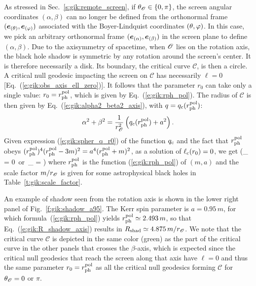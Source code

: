 As stressed in Sec.~\ref{s:gik:remote_screen}, if $\theta_{\mathscr{O}}\in\{0,\pi\}$,
the screen angular coordinates $(\alpha,\beta)$ can no longer be defined from the
orthonormal frame
$(\bm{e}_{(\theta)}, \bm{e}_{(\varphi)})$ associated with the Boyer-Lindquist coordinates $(\theta,\varphi)$.
In this case, we pick an arbitrary orthonormal
frame $(\bm{e}_{(\alpha)}, \bm{e}_{(\beta)})$ in the screen plane to define
$(\alpha,\beta)$.
Due to the axisymmetry of spacetime, when $\mathscr{O}$ lies on the rotation axis, the black hole
shadow is symmetric by any rotation around the screen's center. It
is therefore necessarily a disk. Its boundary, the critical curve $\mathscr{C}$,
is then a circle.
A critical null geodesic impacting the screen on $\mathscr{C}$
has necessarily $\ell=0$ [Eq.~(\ref{e:gik:obs_axis_ell_zero})]. It follows
that the parameter $r_0$ can take only a single value:
$r_0 = r_{\rm ph}^{\rm pol}$, which is
given by Eq.~(\ref{e:gik:rph_pol}). The radius of $\mathscr{C}$ is
then given by Eq.~(\ref{e:gik:alpha2_beta2_axis}), with $q=q_{\rm c}(r_{\rm ph}^{\rm pol})$:
\[
    \alpha^2 + \beta^2 = \frac{1}{r_{\mathscr{O}}^2} \left( q_{\rm c}(r_{\rm ph}^{\rm pol}) + a^2\right) .
\]
Given expression (\ref{e:gik:spher_q_r0}) of the function $q_{\rm c}$
and the fact that $r_{\rm ph}^{\rm pol}$ obeys
$(r_{\rm ph}^{\rm pol})^4 (r_{\rm ph}^{\rm pol} - 3m)^2 = a^4 (r_{\rm ph}^{\rm pol} + m)^2$,
as a solution of $\ell_{\rm c}(r_0) = 0$, we get
\be \label{e:gik:R_shadow_axis}
    \qquad (\th_{\Obs} = 0\ \mbox{or}\  \th_{\Obs} = \pi)
\ee
where $r_{\rm ph}^{\rm pol}$ is the function (\ref{e:gik:rph_pol}) of $(m, a)$
and the scale factor $m/r_{\mathscr{O}}$ is given for some astrophysical black holes
in Table~\ref{t:gik:scale_factor}.

\begin{texample}{}{}
An example of shadow seen from the rotation axis is shown in the lower right panel of
Fig.~\ref{f:gik:shadow_a95}. The Kerr spin parameter is $a=0.95\, m$, for which
formula~(\ref{e:gik:rph_pol})
yields $r_{\rm ph}^{\rm pol} \simeq 2.493\, m$,
so that Eq.~(\ref{e:gik:R_shadow_axis}) results in
$R_{\rm shad} \simeq 4.875\, m / r_{\mathscr{O}}$.
We note that the critical curve $\mathscr{C}$ is depicted in the same color (green)
as the part of the critical curve in the other panels that crosses the $\beta$-axis,
which is expected since the critical null geodesics that reach the screen along
that axis have $\ell=0$ and thus the same parameter $r_0 = r_{\rm ph}^{\rm pol}$
as all the critical null geodesics forming $\mathscr{C}$ for $\theta_{\mathscr{O}} = 0$
or $\pi$.
\end{texample}

